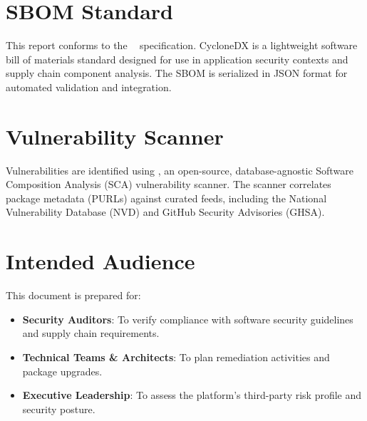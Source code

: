 \section{SBOM Standard}
This report conforms to the \textbf{\SbomFormat\ \SbomSpecVersion} specification. CycloneDX is a lightweight software bill of materials standard designed for use in application security contexts and supply chain component analysis. The SBOM is serialized in JSON format for automated validation and integration.

\section{Vulnerability Scanner}
Vulnerabilities are identified using \textbf{\VulScanner}, an open-source, database-agnostic Software Composition Analysis (SCA) vulnerability scanner. The scanner correlates package metadata (PURLs) against curated feeds, including the National Vulnerability Database (NVD) and GitHub Security Advisories (GHSA).

\section{Intended Audience}
This document is prepared for:
\begin{itemize}
    \item \textbf{Security Auditors}: To verify compliance with software security guidelines and supply chain requirements.
    \item \textbf{Technical Teams \& Architects}: To plan remediation activities and package upgrades.
    \item \textbf{Executive Leadership}: To assess the platform's third-party risk profile and security posture.
\end{itemize}
